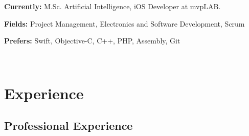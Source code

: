 \documentclass[a4paper,nocolors]{cv-friggeri-x}
\begin{document}
\textbf{Currently:} M.Sc. Artificial Intelligence, iOS Developer at mvpLAB.

\textbf{Fields:} Project Management, Electronics and Software Development, Scrum

\textbf{Prefers:} Swift, Objective-C, C++, PHP, Assembly, Git

\\

\section{Experience}

\subsection{Professional Experience}
\end{document}

